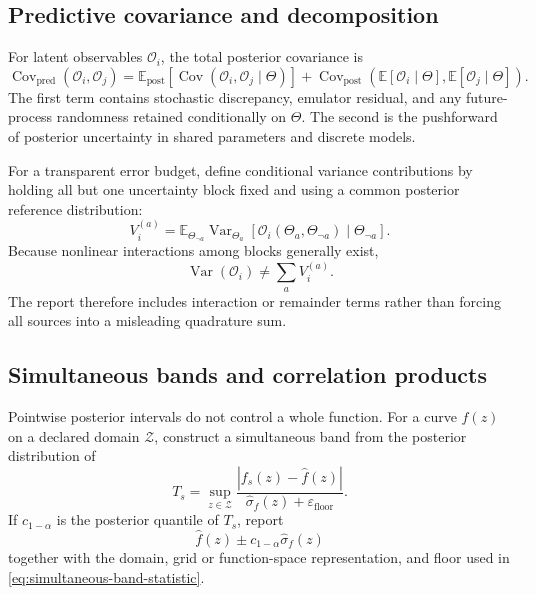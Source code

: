 \documentclass[11pt]{article}
\newcommand{\Cov}{\operatorname{Cov}}
\newcommand{\Var}{\operatorname{Var}}
\newcommand{\E}{\mathbb E}
\newcommand{\cO}{\mathcal O}
\newcommand{\cZ}{\mathcal Z}
\newcommand{\eps}{\varepsilon}
\newcommand{\abs}[1]{\left|#1\right|}
\newcommand{\post}{\mathrm{post}}
\newcommand{\pred}{\mathrm{pred}}
\begin{document}
\subsection{Predictive covariance and decomposition}

For latent observables \(\cO_i\), the total posterior covariance is
\begin{equation}
 \Cov_{\pred}(\cO_i,\cO_j)
 =
 \E_{\post}\!\left[
 \Cov(\cO_i,\cO_j\mid\Theta)
 \right]
 +
 \Cov_{\post}\!\left(
 \E[\cO_i\mid\Theta],
 \E[\cO_j\mid\Theta]
 \right).
 \label{eq:law-total-covariance}
\end{equation}
The first term contains stochastic discrepancy, emulator residual, and any
future-process randomness retained conditionally on \(\Theta\).  The second is
the pushforward of posterior uncertainty in shared parameters and discrete
models.

For a transparent error budget, define conditional variance contributions by
holding all but one uncertainty block fixed and using a common posterior
reference distribution:
\begin{equation}
 V_i^{(a)}
 =
 \E_{\Theta_{\neg a}}
 \Var_{\Theta_a}
 \left[
 \cO_i(\Theta_a,\Theta_{\neg a})
 \mid\Theta_{\neg a}
 \right].
 \label{eq:conditional-variance-component}
\end{equation}
Because nonlinear interactions among blocks generally exist,
\begin{equation}
 \Var(\cO_i)
 \neq
 \sum_a V_i^{(a)} .
 \label{eq:variance-not-additive}
\end{equation}
The report therefore includes interaction or remainder terms rather than
forcing all sources into a misleading quadrature sum.

\subsection{Simultaneous bands and correlation products}

Pointwise posterior intervals do not control a whole function.  For a curve
\(f(z)\) on a declared domain \(\cZ\), construct a simultaneous band from the
posterior distribution of
\begin{equation}
 T_s
 =
 \sup_{z\in\cZ}
 \frac{
 \abs{f_s(z)-\widehat f(z)}
 }{
 \widehat\sigma_f(z)+\eps_{\mathrm{floor}}
 } .
 \label{eq:simultaneous-band-statistic}
\end{equation}
If \(c_{1-\alpha}\) is the posterior quantile of \(T_s\), report
\begin{equation}
 \widehat f(z)
 \pm
 c_{1-\alpha}\widehat\sigma_f(z)
 \label{eq:simultaneous-band}
\end{equation}
together with the domain, grid or function-space representation, and floor
used in \cref{eq:simultaneous-band-statistic}.
\end{document}
